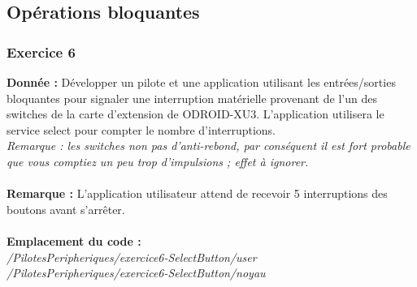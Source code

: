 \subsection{Opérations bloquantes}
\subsubsection{Exercice 6}
\textbf{Donnée : } Développer	un pilote	et	une	application	utilisant	les	entrées/sorties	bloquantes	pour	signaler	une	
interruption	matérielle provenant	de	l’un	des	switches	de	la	carte	d’extension	de	ODROID-XU3.
L’application	utilisera	le	service	select	pour	compter	le	nombre	d’interruptions.\\
\textit{Remarque :	les	switches	non	pas	d’anti-rebond,	par	conséquent il	est	fort	probable	que	vous	
comptiez	un	peu	trop	d’impulsions ;	effet	à	ignorer.	}
\\\\
\textbf{Remarque : }L'application utilisateur attend de recevoir 5 interruptions des boutons avant s'arrêter.\\\\
\textbf{Emplacement du code : }\\ \textit{/PilotesPeripheriques/exercice6-SelectButton/user}\\
\textit{/PilotesPeripheriques/exercice6-SelectButton/noyau}\\


